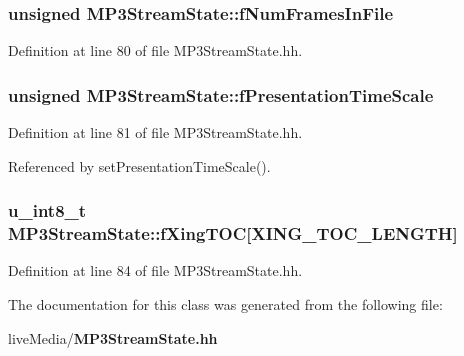 \subsubsection[{f\+Num\+Frames\+In\+File}]{\setlength{\rightskip}{0pt plus 5cm}unsigned M\+P3\+Stream\+State\+::f\+Num\+Frames\+In\+File\hspace{0.3cm}{\ttfamily [private]}}\label{classMP3StreamState_ab646f6745aaf08b0d47244f2314772e9}


Definition at line 80 of file M\+P3\+Stream\+State.\+hh.

\subsubsection[{f\+Presentation\+Time\+Scale}]{\setlength{\rightskip}{0pt plus 5cm}unsigned M\+P3\+Stream\+State\+::f\+Presentation\+Time\+Scale\hspace{0.3cm}{\ttfamily [private]}}\label{classMP3StreamState_a79470c07c24813f30050bf53c31ad68f}


Definition at line 81 of file M\+P3\+Stream\+State.\+hh.



Referenced by set\+Presentation\+Time\+Scale().

\subsubsection[{f\+Xing\+T\+O\+C}]{\setlength{\rightskip}{0pt plus 5cm}u\+\_\+int8\+\_\+t M\+P3\+Stream\+State\+::f\+Xing\+T\+O\+C[{\bf X\+I\+N\+G\+\_\+\+T\+O\+C\+\_\+\+L\+E\+N\+G\+T\+H}]\hspace{0.3cm}{\ttfamily [private]}}\label{classMP3StreamState_a701a1980640845f9862aeb06b8a0372b}


Definition at line 84 of file M\+P3\+Stream\+State.\+hh.



The documentation for this class was generated from the following file\+:\begin{DoxyCompactItemize}
\item 
live\+Media/{\bf M\+P3\+Stream\+State.\+hh}\end{DoxyCompactItemize}
